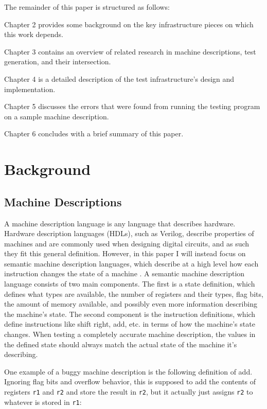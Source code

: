 \documentclass[letterpaper,12pt]{article}
\begin{document}
The remainder of this paper is structured as follows:

Chapter 2 provides some background on the key infrastructure pieces on which this work depends.

Chapter 3 contains an overview of related research in machine descriptions, test generation, and their intersection.

Chapter 4 is a detailed description of the test infrastructure's design and implementation.

Chapter 5 discusses the errors that were found from running the testing program on a sample machine description.

Chapter 6 concludes with a brief summary of this paper.

\section{Background}
\subsection{Machine Descriptions}

A machine description language is any language that describes hardware. Hardware description languages (HDLs), such as Verilog, describe properties of machines and are commonly used when designing digital circuits, and as such they fit this general definition. However, in this paper I will instead focus on semantic machine description languages, which describe at a high level how each instruction changes the state of a machine \cite{Design}. A semantic machine description language consists of two main components. The first is a state definition, which defines what types are available, the number of registers and their types, flag bits, the amount of memory available, and possibly even more information describing the machine's state. The second component is the instruction definitions, which define instructions like shift right, add, etc. in terms of how the machine's state changes. When testing a completely accurate machine description, the values in the defined state should always match the actual state of the machine it's describing.

One example of a buggy machine description is the following definition of add. Ignoring flag bits and overflow behavior, this is supposed to add the contents of registers \texttt{r1} and \texttt{r2} and store the result in \texttt{r2}, but it actually just assigns \texttt{r2} to whatever is stored in \texttt{r1}: \\
\end{document}
